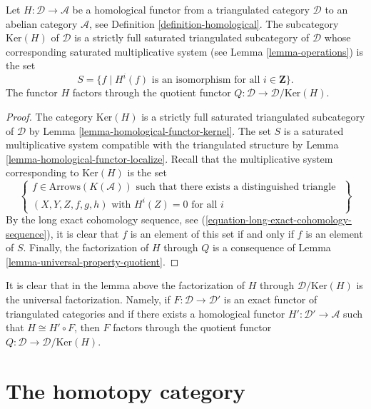 \begin{lemma}
\label{lemma-acyclic-general}
Let $H : \mathcal{D} \to \mathcal{A}$ be a homological functor from a
triangulated category $\mathcal{D}$ to an abelian category $\mathcal{A}$, see
Definition \ref{definition-homological}.
The subcategory $\text{Ker}(H)$ of $\mathcal{D}$ is a strictly full
saturated triangulated subcategory of $\mathcal{D}$ whose corresponding
saturated multiplicative system (see
Lemma \ref{lemma-operations})
is the set
$$
S = \{f \mid H^i(f)\text{ is an isomorphism for all }i \in \mathbf{Z}\}.
$$
The functor $H$ factors through the quotient functor
$Q : \mathcal{D} \to \mathcal{D}/\text{Ker}(H)$.
\end{lemma}

\begin{proof}
The category $\text{Ker}(H)$ is a strictly full saturated triangulated
subcategory of $\mathcal{D}$ by
Lemma \ref{lemma-homological-functor-kernel}.
The set $S$ is a saturated multiplicative system compatible with the
triangulated structure by
Lemma \ref{lemma-homological-functor-localize}.
Recall that the multiplicative system corresponding to
$\text{Ker}(H)$ is the set
$$
\left\{
\begin{matrix}
f \in \text{Arrows}(K(\mathcal{A}))
\text{ such that there exists a distinguished triangle }\\
(X, Y, Z, f, g, h)\text{ with } H^i(Z) = 0 \text{ for all }i
\end{matrix}
\right\}
$$
By the long exact cohomology sequence, see
(\ref{equation-long-exact-cohomology-sequence}),
it is clear that $f$ is an element of this set if and only if $f$ is
an element of $S$. Finally, the factorization of $H$ through $Q$ is a
consequence of
Lemma \ref{lemma-universal-property-quotient}.
\end{proof}

\noindent
It is clear that in the lemma above the factorization of $H$ through
$\mathcal{D}/\text{Ker}(H)$ is the universal factorization. Namely, if
$F : \mathcal{D} \to \mathcal{D}'$ is an exact functor of triangulated
categories and if there exists a homological functor
$H' : \mathcal{D}' \to \mathcal{A}$ such that $H \cong H' \circ F$, then
$F$ factors through the quotient functor
$Q : \mathcal{D} \to \mathcal{D}/\text{Ker}(H)$.








\section{The homotopy category}
\label{section-homotopy}


